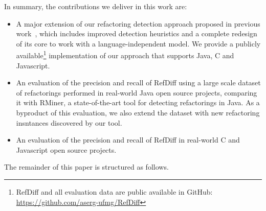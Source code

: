 


In summary, the contributions we deliver in this work are:
\begin{itemize}
\item A major extension of our refactoring detection approach proposed in previous work~\cite{msr2017}, which includes improved detection heuristics and a complete redesign of its core to work with a language-independent model.
We provide a publicly available\footnote{RefDiff and all evaluation data are public available in GitHub:\\
\url{https://github.com/aserg-ufmg/RefDiff}} implementation of our approach that supports Java, C and Javascript.
\item An evaluation of the precision and recall of RefDiff using a large scale dataset of refactorings performed in real-world Java open source projects, comparing it with RMiner, a state-of-the-art tool for detecting refactorings in Java. As a byproduct of this evaluation, we also extend the dataset with new refactoring insntances discovered by our tool. 
\item An evaluation of the precision and recall of RefDiff in real-world C and Javascript open source projects.
\end{itemize}

The remainder of this paper is structured as follows.  %
